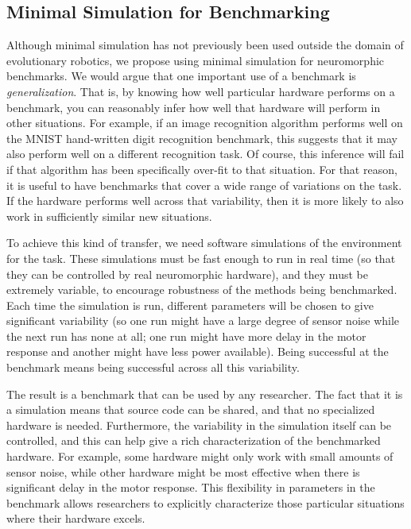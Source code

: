 \documentclass{frontiersSCNS} %
\begin{document}
\subsection{Minimal Simulation for Benchmarking}

Although minimal simulation has not previously been used outside the domain of evolutionary robotics, we propose
using minimal simulation for neuromorphic benchmarks.  We would argue that
one important use of a benchmark is \emph{generalization}.  That is, by knowing how well particular
hardware performs on a benchmark, you can reasonably infer how well
that hardware will perform in other situations.  For example, if an image recognition
algorithm performs well on the MNIST hand-written digit recognition
benchmark, this suggests that it may also perform well on
a different recognition task.  Of course, this inference will fail if that
algorithm has been specifically over-fit to that situation.  For
that reason, it is useful to have benchmarks that cover a wide range
of variations on the task.  If the hardware performs well across that
variability, then it is more likely to also work in sufficiently similar new situations.

To achieve this kind of transfer, we need software simulations of the environment for the task.
These simulations
must be fast enough to run in real time (so that they can be controlled by
real neuromorphic hardware), and they must be extremely variable, to encourage
robustness of the methods being benchmarked.  Each time
the simulation is run, different parameters will be chosen to give significant variability
(so one run might have a large degree of sensor noise while the next run has
none at all; one run might have more delay in the motor response and another
might have less power available).  Being successful at the benchmark means
being successful across all this variability.  

The result is a benchmark that can be used by any researcher.  The fact
that it is a simulation means that source code can be shared, and that no
specialized hardware is needed.  Furthermore, the variability in the simulation
itself can be controlled, and this can help give a rich characterization of
the benchmarked hardware.  For example, some hardware might only work with
small amounts of sensor noise, while other hardware might be most effective when there
is significant delay in the motor response.  This flexibility in parameters
in the benchmark allows researchers to explicitly characterize those particular
situations where their hardware excels.  
\end{document}

